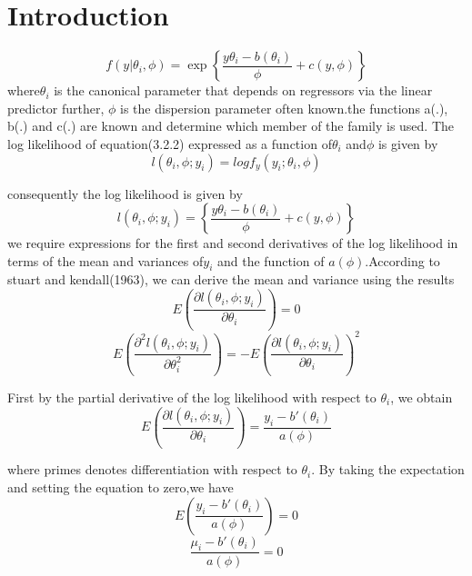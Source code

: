 \documentclass[twoside,a4paper,12pt]{article}
\begin{document}
\section{Introduction}	
	\begin{equation}
		f(y|\theta_i,\phi) = 
		\exp\left\{ \frac{y\theta_i-b(\theta_i)}{\phi} + c(y,\phi)\right\}
	\end{equation} 
	where$\theta_i$ is the canonical parameter that depends on regressors via the linear predictor further, $\phi$ is the dispersion parameter often known.the functions a(.), b(.) and c(.) are known and determine which member of the family is used.
	The log likelihood of equation(3.2.2) expressed as a function of$\theta_i$ and$\phi$ is given by\centering
	\begin{equation}
		l(\theta_i,\phi;y_i)= logf_y(y_i;\theta_i,\phi) 
	\end{equation}
	
	consequently the log likelihood is given by
	\begin{equation} 
		l(\theta_i,\phi;y_i) =\left\{ \frac{y\theta_i-b(\theta_i)}{\phi} + c(y,\phi)\right\}
	\end{equation}
	we require expressions for the first and second derivatives of the log likelihood in terms of the mean and variances of$y_i$ and the function of $a(\phi)$.According to stuart and kendall(1963), we can derive the mean and variance using the results
	\begin{equation}
		E\left(\frac{\partial l(\theta_i,\phi;y_i)}{\partial\theta_i}\right)=0
	\end{equation}
	\begin{equation}	
		E\left(\frac{\partial^2 l(\theta_i,\phi;y_i)}{\partial\theta_i^2}\right)= -E\left(\frac{\partial l(\theta_i,\phi;y_i)}{\partial\theta_i}\right)^2
	\end{equation}
	
	First by the partial derivative of the log likelihood with respect to $\theta_i$, we obtain 
	\begin{equation}
		E\left(\frac{\partial l(\theta_i,\phi;y_i)}{\partial\theta_i}\right)=\frac{y_i-b\prime(\theta_i)}{a(\phi)}
	\end{equation}
	
	where primes denotes differentiation with respect to $\theta_i$. By taking the expectation and setting the equation to zero,we have
	\begin{equation}
		E\left(\frac{y_i-b\prime(\theta_i)}{a(\phi)}\right)=0
	\end{equation}
	\begin{equation}
		\frac{\mu_i-b\prime(\theta_i)}{a(\phi)}= 0
	\end{equation}
	
\end{document}
